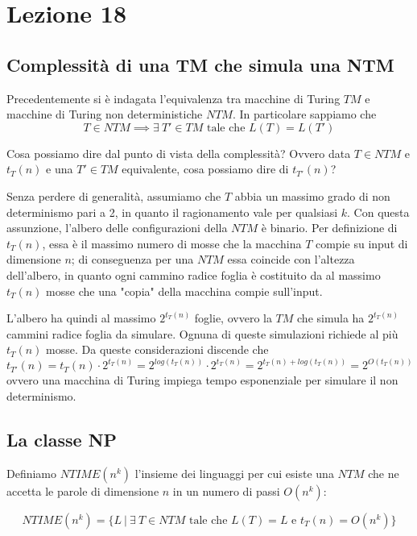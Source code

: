 
\section{Lezione 18}

\subsection{Complessità di una TM che simula una NTM}

Precedentemente si è indagata l'equivalenza tra macchine di Turing $TM$ e macchine di Turing non deterministiche $NTM$. In particolare sappiamo che 
\[
	T \in NTM \implies \exists \ T' \in TM \text{ tale che } L(T) = L(T')
\]

Cosa possiamo dire dal punto di vista della complessità? Ovvero data $T \in NTM$ e $t_T(n)$ e una $T' \in TM$ equivalente, cosa possiamo dire di $t_{T'}(n)$?

Senza perdere di generalità, assumiamo che $T$ abbia un massimo grado di non determinismo pari a 2, in quanto il ragionamento vale per qualsiasi $k$. Con questa assunzione, l'albero delle configurazioni della $NTM$ è binario. Per definizione di $t_T(n)$, essa è il massimo numero di mosse che la macchina $T$ compie su input di dimensione $n$; di conseguenza per una $NTM$ essa coincide con l'altezza dell'albero, in quanto ogni cammino radice foglia è costituito da al massimo $t_T(n)$ mosse che una "copia" della macchina compie sull'input.

L'albero ha quindi al massimo $2^{t_T(n)}$  foglie, ovvero la $TM$ che simula ha $2^{t_T(n)}$ cammini radice foglia da simulare. Ognuna di queste simulazioni richiede al più $t_T(n)$ mosse. Da queste considerazioni discende che
\[
	t_{T'}(n) = t_{T}(n) \cdot 2^{t_T(n)} = 2^{log(t_T(n))} \cdot 2^{t_T(n)} = 2^{t_T(n) + log(t_T(n))} = 2^{O(t_T(n))}
\]
ovvero una macchina di Turing impiega tempo esponenziale per simulare il non determinismo.

\subsection{La classe NP}

Definiamo $NTIME(n^k)$ l'insieme dei linguaggi per cui esiste una $NTM$ che ne accetta le parole di dimensione $n$ in un numero di passi $O(n^k)$:

\[
	NTIME(n^k) = \{ L \ | \ \exists \ T \in NTM \text{ tale che } L(T) = L \text{ e } t_T(n) = O(n^k) \}
\]

